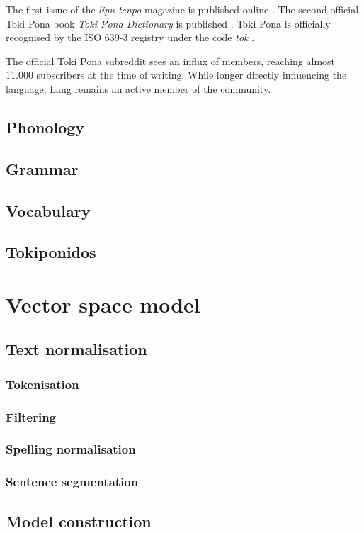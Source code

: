 \documentclass[14pt, a4paper]{extreport}
\begin{document}
The first issue of the \textit{lipu tenpo} magazine is published online \parencite{liputenpo}. The second official Toki Pona book \textit{Toki Pona Dictionary} is published \parencite{ku}. Toki Pona is officially recognised by the ISO 639-3 registry under the code \textit{tok} \parencite{isoproof}.

The official Toki Pona subreddit sees an influx of members, reaching almost 11.000 subscribers at the time of writing. While longer directly influencing the language, Lang remains an active member of the community.
    \subsection{Phonology}
    \subsection{Grammar}
    \subsection{Vocabulary}
    \subsection{Tokiponidos}
  \section{Vector space model}
    \subsection{Text normalisation}
      \subsubsection{Tokenisation}
      \subsubsection{Filtering}
      \subsubsection{Spelling normalisation}
      \subsubsection{Sentence segmentation}
    \subsection{Model construction}
\end{document}
